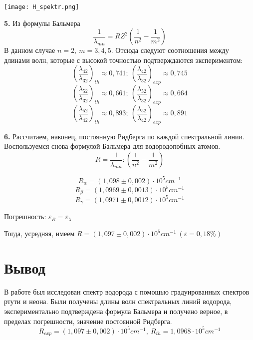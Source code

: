 \documentclass[a4paper,12pt]{article}
\newcommand{\eps}{\varepsilon}
\begin{document}
\texttt{[image: H\_spektr.png]}

{\bf 5. } Из формулы Бальмера
	$$\frac1{\lambda_{mn} } = RZ^2\left(\frac1{n^2} - \frac1{m^2}\right)$$
В данном случае $n=2,\ m = 3,4,5$.
Отсюда следуют соотношения между длинами волн, которые с высокой точностью подтверждаются экспериментом:
$$\left(\frac{\lambda_{42}}{\lambda_{32}}\right)_{th} \approx 0,741; \ \left(\frac{\lambda_{42}}{\lambda_{32}}\right)_{exp} \approx 0,745$$
$$\left(\frac{\lambda_{52}}{\lambda_{32}}\right)_{th} \approx 0,661; \ \left(\frac{\lambda_{52}}{\lambda_{32}}\right)_{exp} \approx 0,664$$
$$\left(\frac{\lambda_{52}}{\lambda_{42}}\right)_{th} \approx 0,893; \ \left(\frac{\lambda_{52}}{\lambda_{42}}\right)_{exp} \approx 0,891$$

{\bf 6. } Рассчитаем, наконец, постоянную Ридберга по каждой спектральной линии. Воспользуемся снова формулой Бальмера для водородопобных атомов.
$$ R = \frac1{\lambda_{mn}} : \left(\frac1{n^2} - \frac1{m^2}\right)$$

$$R_{\alpha} = (1,098 \pm 0,002)\cdot10^5 cm^{-1}$$
$$R_{\beta} = (1,0969 \pm 0,0013)\cdot10^5 cm^{-1}$$
$$R_{\gamma} = (1,0971 \pm 0,0012)\cdot10^5 cm^{-1}$$

Погрешность: $\eps_R = \eps_{\lambda}$ 

Тогда, усредняя, имеем $R = (1,097 \pm  0,002)\cdot10^5 cm^{-1}\ (\eps = 0,18\%)$

\section{Вывод}
В работе был исследован спектр водорода с помощью градуированных спектров ртути и неона. Были получены длины волн спектральных линий водорода, экспериментально подтверждена формула Бальмера и получено верное, в пределах погрешности, значение постоянной Ридберга.
$$R_{exp} = (1,097 \pm  0,002)\cdot10^5 cm^{-1}, \ R_{th} = 1,0968\cdot10^5 cm^{-1}$$
\end{document}
